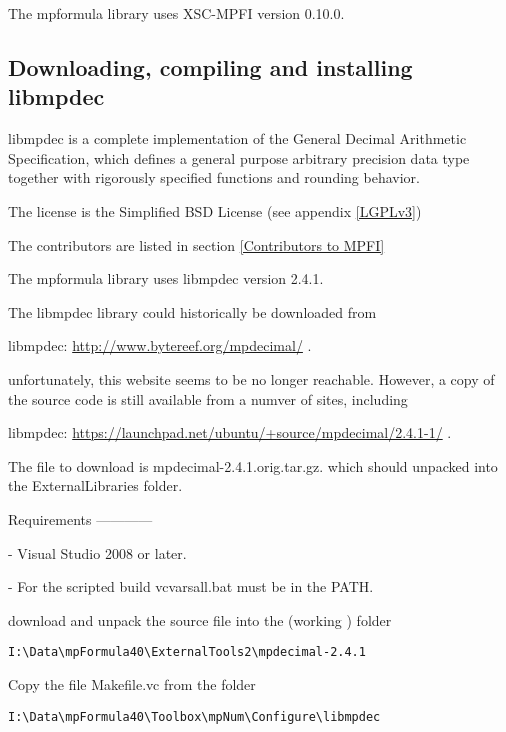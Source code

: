 The mpformula library uses XSC-MPFI version 0.10.0.



\subsection{Downloading, compiling and installing libmpdec}

libmpdec is a complete implementation of the General Decimal Arithmetic Specification, which defines a general purpose arbitrary precision data type together with rigorously specified functions and rounding behavior. 

\vpara
The license is the  Simplified BSD License (see appendix \ref{LGPLv3})

The contributors are listed in section \ref{Contributors to MPFI}

The mpformula library uses libmpdec version 2.4.1.

\vpara
The libmpdec library could historically be downloaded from

\vpara
libmpdec: \href{http://www.bytereef.org/mpdecimal/}{http://www.bytereef.org/mpdecimal/} . 

unfortunately, this website seems to be no longer reachable. However, a copy of the source code is still available from a numver of sites, including

\vpara
libmpdec: \href{https://launchpad.net/ubuntu/+source/mpdecimal/2.4.1-1}{https://launchpad.net/ubuntu/+source/mpdecimal/2.4.1-1/} . 




\vpara
The file to download is mpdecimal-2.4.1.orig.tar.gz. which should unpacked into the ExternalLibraries folder.


\vpara
Requirements
------------

- Visual Studio 2008 or later.

- For the scripted build vcvarsall.bat must be in the PATH.


download and unpack the source file into the (working ) folder

\begin{verbatim}
I:\Data\mpFormula40\ExternalTools2\mpdecimal-2.4.1
\end{verbatim}




Copy the file Makefile.vc from the folder

\begin{verbatim}
I:\Data\mpFormula40\Toolbox\mpNum\Configure\libmpdec
\end{verbatim}




